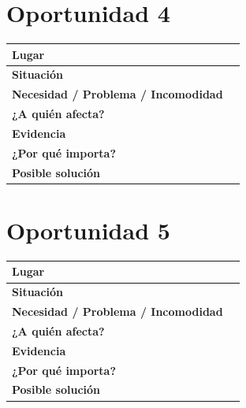 \documentclass[12pt,a4paper]{article}
\begin{document}
	\section*{Oportunidad 4}
	
	\begin{center}
		\small
		\begin{tabular}{|L{0.22\textwidth}|L{0.61\textwidth}|}
			\hline
			\textbf{Lugar} & \rule{0pt}{0.5cm} \\
			\hline
			\textbf{Situación} & \rule{0pt}{0.5cm} \\
			\hline
			\textbf{Necesidad / Problema / Incomodidad} & \rule{0pt}{0.5cm} \\
			\hline
			\textbf{¿A quién afecta?} & \rule{0pt}{0.45cm} \\
			\hline
			\textbf{Evidencia} & \rule{0pt}{0.6cm} \\
			\hline
			\textbf{¿Por qué importa?} & \rule{0pt}{0.5cm} \\
			\hline
			\textbf{Posible solución} & \rule{0pt}{0.45cm} \\
			\hline
		\end{tabular}
	\end{center}
	
	\vspace{0.15cm}
	
	\section*{Oportunidad 5}
	
	\begin{center}
		\small
		\begin{tabular}{|L{0.22\textwidth}|L{0.61\textwidth}|}
			\hline
			\textbf{Lugar} & \rule{0pt}{0.5cm} \\
			\hline
			\textbf{Situación} & \rule{0pt}{0.5cm} \\
			\hline
			\textbf{Necesidad / Problema / Incomodidad} & \rule{0pt}{0.5cm} \\
			\hline
			\textbf{¿A quién afecta?} & \rule{0pt}{0.45cm} \\
			\hline
			\textbf{Evidencia} & \rule{0pt}{0.6cm} \\
			\hline
			\textbf{¿Por qué importa?} & \rule{0pt}{0.5cm} \\
			\hline
			\textbf{Posible solución} & \rule{0pt}{0.45cm} \\
			\hline
		\end{tabular}
	\end{center}
	
\end{document}
